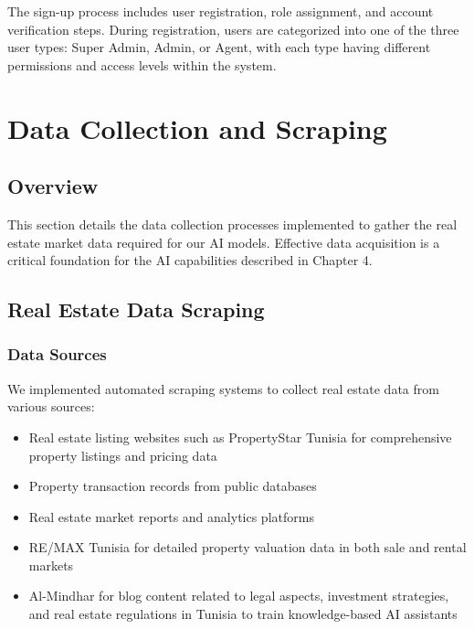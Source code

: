

The sign-up process includes user registration, role assignment, and account verification steps. During registration, users are categorized into one of the three user types: Super Admin, Admin, or Agent, with each type having different permissions and access levels within the system.

\section{Data Collection and Scraping}
\subsection{Overview}
This section details the data collection processes implemented to gather the real estate market data required for our AI models. Effective data acquisition is a critical foundation for the AI capabilities described in Chapter 4.

\subsection{Real Estate Data Scraping}
\subsubsection{Data Sources}
We implemented automated scraping systems to collect real estate data from various sources:
\begin{itemize}
    \item Real estate listing websites such as PropertyStar Tunisia \cite{PropertyStarTunisia} for comprehensive property listings and pricing data
    \item Property transaction records from public databases
    \item Real estate market reports and analytics platforms
    \item RE/MAX Tunisia \cite{RemaxTunisia} for detailed property valuation data in both sale and rental markets
    \item Al-Mindhar \cite{AlMindhar} for blog content related to legal aspects, investment strategies, and real estate regulations in Tunisia to train knowledge-based AI assistants
\end{itemize}

